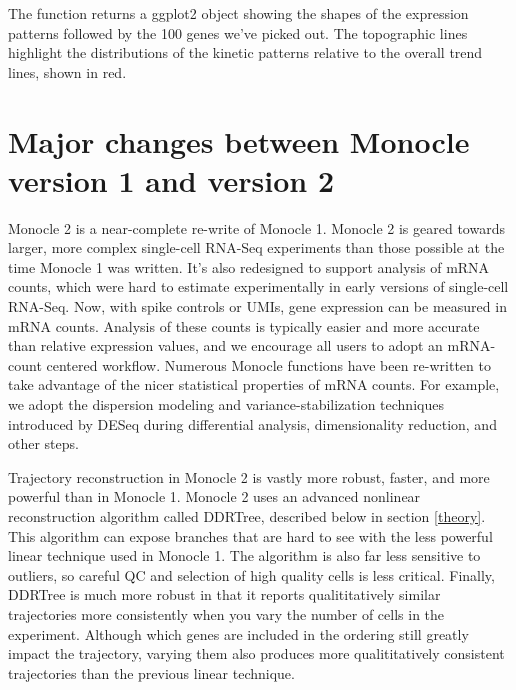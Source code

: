 \documentclass[10pt,oneside]{article}\usepackage[]{graphicx}\usepackage[]{color}
\begin{document}
The  function returns a ggplot2 object showing the shapes of the expression patterns followed by the 100 genes we've picked out.  The topographic lines highlight the distributions of the kinetic patterns relative to the overall trend lines, shown in red.





\section{Major changes between Monocle version 1 and version 2}
Monocle 2 is a near-complete re-write of Monocle 1. Monocle 2 is geared towards larger, more complex single-cell RNA-Seq experiments than those possible at the time Monocle 1 was written. It's also redesigned to support analysis of mRNA counts, which were hard to estimate experimentally in early versions of single-cell RNA-Seq. Now, with spike controls or UMIs, gene expression can  be measured in mRNA counts. Analysis of these counts is typically easier and more accurate than relative expression values, and we encourage all users to adopt an mRNA-count centered workflow. Numerous Monocle functions have been re-written to take advantage of the nicer statistical properties of mRNA counts. For example, we adopt the dispersion modeling and variance-stabilization techniques introduced by DESeq \cite{Anders2010-oc} during differential analysis, dimensionality reduction, and other steps. 
 
Trajectory reconstruction in Monocle 2 is vastly more robust, faster, and more powerful than in Monocle 1. Monocle 2 uses an advanced nonlinear reconstruction algorithm called DDRTree\cite{Mao2015-cs}, described below in section \ref{theory}. This algorithm can expose branches that are hard to see with the less powerful linear technique used in Monocle 1. The algorithm is also far less sensitive to outliers, so careful QC and selection of high quality cells is less critical.  Finally, DDRTree is much more robust in that it reports qualititatively similar trajectories more consistently when you vary the number of cells in the experiment. Although which genes are included in the ordering still greatly impact the trajectory, varying them also produces more qualititatively consistent trajectories than the previous linear technique.
 
\end{document}
